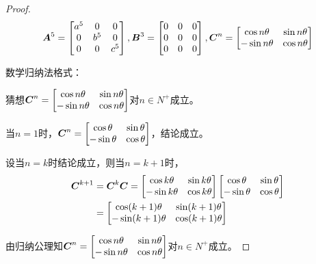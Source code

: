 \begin{proof}
    \begin{equation*}
        \boldsymbol{A}^5=\begin{bmatrix}a^5&0&0\\0&b^5&0\\0&0&c^5\end{bmatrix},\boldsymbol{B}^3=\begin{bmatrix}0&0&0\\0&0&0\\0&0&0\end{bmatrix},\boldsymbol{C}^n=\begin{bmatrix}\cos n\theta&\sin n\theta\\-\sin n\theta&\cos n\theta\end{bmatrix}
    \end{equation*}

    数学归纳法格式：

    猜想\(\boldsymbol{C}^n=\begin{bmatrix}\cos n\theta&\sin n\theta\\-\sin n\theta&\cos n\theta\end{bmatrix}\)对\(n\in N^+\)成立。

    当\(n=1\)时，\(\boldsymbol{C}^n=\begin{bmatrix}\cos \theta&\sin \theta\\-\sin \theta&\cos \theta\end{bmatrix}\)，结论成立。

    设当\(n=k\)时结论成立，则当\(n=k+1\)时，
    \begin{align*}
        \boldsymbol{C}^{k+1} & =\boldsymbol{C}^k\boldsymbol{C}=\begin{bmatrix}\cos k\theta&\sin k\theta\\-\sin k\theta&\cos k\theta\end{bmatrix}\begin{bmatrix}\cos \theta&\sin \theta\\-\sin \theta&\cos \theta\end{bmatrix} \\
                    & =\begin{bmatrix}\cos (k+1)\theta&\sin (k+1)\theta\\-\sin (k+1)\theta&\cos (k+1)\theta\end{bmatrix}
    \end{align*}

    由归纳公理知\(\boldsymbol{C}^n=\begin{bmatrix}\cos n\theta&\sin n\theta\\-\sin n\theta&\cos n\theta\end{bmatrix}\)对\(n\in N^+\)成立。
\end{proof}

